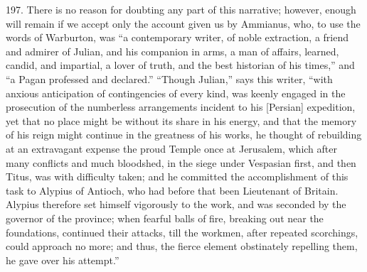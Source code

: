 197.
There is no reason for doubting any part of this narrative; however,
enough will remain if we accept only the account given us by Ammianus,
who, to use the words of Warburton, was ``a contemporary writer, of
noble extraction, a friend and admirer of Julian, and his companion in
arms, a man of affairs, learned, candid, and impartial, a lover of
truth, and the best historian of his times,'' and ``a Pagan professed
and declared.'' ``Though Julian,'' says this writer, ``with anxious
anticipation of contingencies of every kind, was keenly engaged in the
prosecution of the numberless arrangements incident to his [Persian]
expedition, yet that no place might be without its share in his
energy, and that the memory of his reign might continue in the
greatness of his works, he thought of rebuilding at an extravagant
expense the proud Temple once at Jerusalem, which after many conflicts
and much bloodshed, in the siege under Vespasian first, and then
Titus, was with difficulty taken; and he committed the accomplishment
of this task to Alypius of Antioch, who had before that been
Lieutenant of Britain. Alypius therefore set himself vigorously to the
work, and was seconded by the governor of the province; when fearful
balls of fire, breaking out near the foundations, continued their
attacks, till the workmen, after repeated scorchings, could approach
no more; and thus, the fierce element obstinately repelling them, he
gave over his attempt.''

